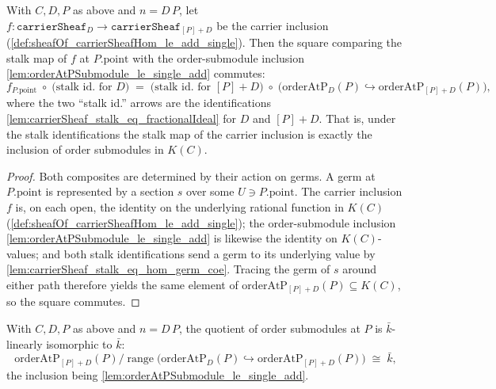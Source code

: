 \begin{lemma}
  \label{lem:cokernel_stalk_at_naturality}
  With \(C, D, P\) as above and \(n = D\,P\), let
  \(f : \texttt{carrierSheaf}_D \to \texttt{carrierSheaf}_{[P]+D}\) be the
  carrier inclusion (\cref{def:sheafOf_carrierSheafHom_le_add_single}). Then the
  square comparing the stalk map of \(f\) at \(P.\mathrm{point}\) with the
  order-submodule inclusion \cref{lem:orderAtPSubmodule_le_single_add} commutes:
  \[
    f_{P.\mathrm{point}} \;\circ\;
      \bigl(\text{stalk id.\ for } D\bigr)
    \;=\;
    \bigl(\text{stalk id.\ for } [P]+D\bigr) \;\circ\;
      \bigl(\mathrm{orderAtP}_D(P) \hookrightarrow
            \mathrm{orderAtP}_{[P]+D}(P)\bigr),
  \]
  where the two ``stalk id.'' arrows are the identifications
  \cref{lem:carrierSheaf_stalk_eq_fractionalIdeal} for \(D\) and \([P]+D\). That
  is, under the stalk identifications the stalk map of the carrier inclusion is
  exactly the inclusion of order submodules in \(K(C)\).
\end{lemma}

\begin{proof}
  Both composites are determined by their action on germs. A germ at
  \(P.\mathrm{point}\) is represented by a section \(s\) over some
  \(U \ni P.\mathrm{point}\). The carrier inclusion \(f\) is, on each open, the
  identity on the underlying rational function in \(K(C)\)
  (\cref{def:sheafOf_carrierSheafHom_le_add_single}); the order-submodule
  inclusion \cref{lem:orderAtPSubmodule_le_single_add} is likewise the identity
  on \(K(C)\)-values; and both stalk identifications send a germ to its
  underlying value by \cref{lem:carrierSheaf_stalk_eq_hom_germ_coe}. Tracing the
  germ of \(s\) around either path therefore yields the same element of
  \(\mathrm{orderAtP}_{[P]+D}(P) \subseteq K(C)\), so the square commutes.
\end{proof}

\begin{lemma}
  \label{lem:orderAtP_residue_linearEquiv}
  With \(C, D, P\) as above and \(n = D\,P\), the quotient of order submodules at
  \(P\) is \(\bar k\)-linearly isomorphic to \(\bar k\):
  \[
    \mathrm{orderAtP}_{[P]+D}(P)
      \big/ \operatorname{range}\!\bigl(
        \mathrm{orderAtP}_D(P) \hookrightarrow
        \mathrm{orderAtP}_{[P]+D}(P)\bigr)
    \;\cong\; \bar k,
  \]
  the inclusion being \cref{lem:orderAtPSubmodule_le_single_add}.
\end{lemma}

